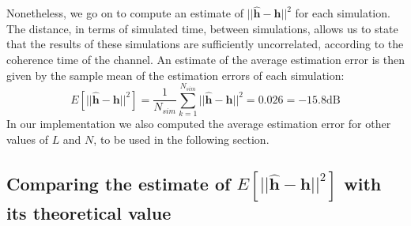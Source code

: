 \documentclass[10pt]{article}
\newcommand{\dB} {\mathrm{dB}}
\begin{document}
Nonetheless, we go on to compute an estimate of $||\mathbf{\hat{h}}-\mathbf{h}||^2$ for each simulation. The distance, in terms of simulated time, between simulations, allows us to state that the results of these simulations are sufficiently uncorrelated, according to the coherence time of the channel. An estimate of the average estimation error is then given by the sample mean of the estimation errors of each simulation:
\begin{equation}
E[||\mathbf{\hat{h}}-\mathbf{h}||^2] = \frac{1}{N_{sim}}\sum_{k=1}^{N_{sim}} ||\mathbf{\hat{h}}-\mathbf{h}||^2 = 0.026 = -15.8 \dB
\end{equation}
In our implementation we also computed the average estimation error for other values of $L$ and $N$, to be used in the following section.


\subsection*{Comparing the estimate of $E[||\mathbf{\hat{h}}-\mathbf{h}||^2]$ with its theoretical value}
\end{document}
